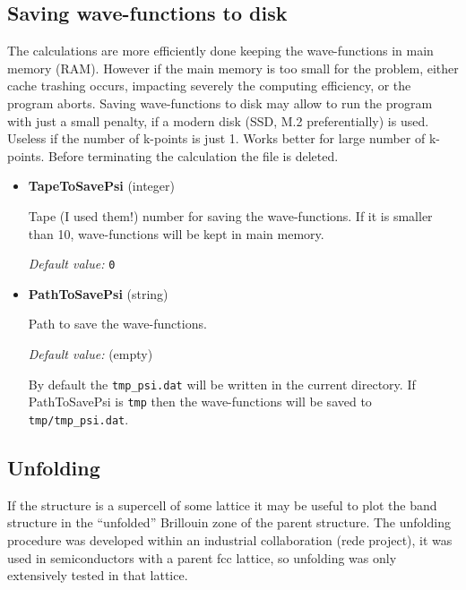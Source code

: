 \documentclass[11pt]{article}
\begin{document}
\subsection{Saving wave-functions to disk}

The calculations are more efficiently done keeping the wave-functions in main memory (RAM).
However if the main memory is too small for the problem, either cache trashing occurs,
impacting severely the computing efficiency, or the program aborts.
Saving wave-functions to disk may allow to run the program with just a small penalty,
if a modern disk (SSD, M.2 preferentially) is used.
Useless if the number of k-points is just 1.  Works better for large number of k-points.
Before terminating the calculation the file is deleted.


\begin{itemize}

\item{\bf TapeToSavePsi} (integer)

  Tape (I used them!) number for saving the wave-functions.  If it is smaller than 10,
  wave-functions will be kept in main memory.

  \textit{Default value:}  \texttt{0}

\item{\bf PathToSavePsi} (string)

  Path to save the wave-functions.

  \textit{Default value:}  (empty)

  By default the \texttt{tmp{\_}psi.dat} will be written in the current directory.
  If PathToSavePsi is \texttt{tmp} then the wave-functions will be saved to
  \texttt{tmp/tmp{\_}psi.dat}.


\end{itemize}


\subsection{Unfolding}

If the structure is a supercell of some lattice it may be useful to plot the band structure
in the ``unfolded'' Brillouin zone of the parent structure.
The unfolding procedure was developed within an industrial collaboration (rede project),
it was used in semiconductors with a parent fcc lattice,
so unfolding was only extensively tested in that lattice.
\end{document}
